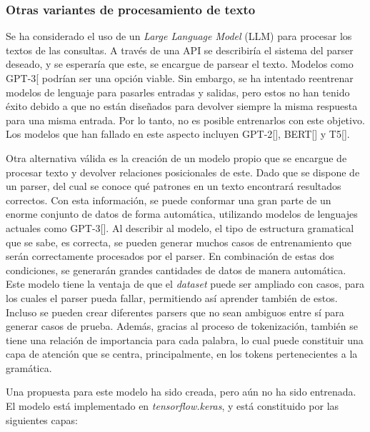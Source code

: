 \subsubsection{Otras variantes de procesamiento de texto }
Se ha considerado el uso de un \textit{Large Language Model} (LLM) para procesar los textos de las consultas. A través de una API se describiría el sistema del parser deseado, y se esperaría que este, se encargue de parsear el texto. Modelos como GPT-3[\cite{gpt3} podrían ser una opción viable. Sin embargo, se ha intentado reentrenar modelos de lenguaje para pasarles entradas y salidas, pero estos no han tenido éxito debido a que no están diseñados para devolver siempre la misma respuesta para una misma entrada. Por lo tanto, no es posible entrenarlos con este objetivo. Los modelos que han fallado en este aspecto incluyen GPT-2[\cite{gpt2}], BERT[\cite{bert}] y T5[\cite{t5}].

Otra alternativa v\'alida es la creación de un modelo propio que se encargue de procesar texto y devolver relaciones posicionales de este. Dado que se dispone de un parser, del cual se conoce qu\'e patrones en un texto encontrará resultados correctos. Con esta información, se puede conformar una gran parte de un enorme conjunto de datos de forma automática, utilizando modelos de lenguajes actuales como GPT-3[\cite{gpt3}]. Al describir al modelo, el tipo de estructura gramatical que se sabe, es correcta, se pueden generar muchos casos de entrenamiento que ser\'an correctamente procesados por el parser. En combinación de estas dos condiciones, se generarán grandes cantidades de datos de manera automática. Este modelo tiene la ventaja de que el \textit{dataset} puede ser ampliado con casos, para los cuales el parser pueda fallar, permitiendo así aprender tambi\'en de estos. Incluso se pueden crear diferentes parsers que no sean ambiguos entre sí para generar casos de prueba. Adem\'as, gracias al proceso de tokenizaci\'on, tambi\'en se tiene una relaci\'on de importancia para cada palabra, lo cual puede constituir una capa de atenci\'on que se centra, principalmente, en los tokens pertenecientes a la gram\'atica.

Una propuesta para este modelo ha sido creada, pero aún no ha sido entrenada. El modelo está implementado en \textit{tensorflow.keras}, y est\'a constituido por las siguientes capas:

